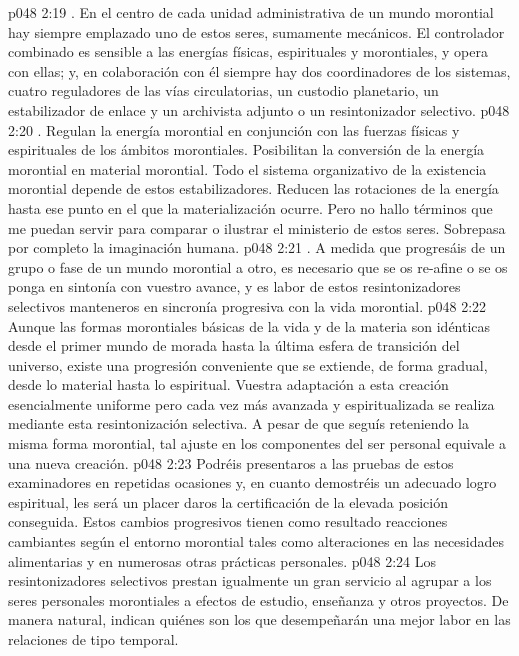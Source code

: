 \vs p048 2:19 . En el centro de cada unidad administrativa de un mundo morontial hay siempre emplazado uno de estos seres, sumamente mecánicos. El controlador combinado es sensible a las energías físicas, espirituales y morontiales, y opera con ellas; y, en colaboración con él siempre hay dos coordinadores de los sistemas, cuatro reguladores de las vías circulatorias, un custodio planetario, un estabilizador de enlace y un archivista adjunto o un resintonizador selectivo.
\vs p048 2:20 . Regulan la energía morontial en conjunción con las fuerzas físicas y espirituales de los ámbitos morontiales. Posibilitan la conversión de la energía morontial en material morontial. Todo el sistema organizativo de la existencia morontial depende de estos estabilizadores. Reducen las rotaciones de la energía hasta ese punto en el que la materialización ocurre. Pero no hallo términos que me puedan servir para comparar o ilustrar el ministerio de estos seres. Sobrepasa por completo la imaginación humana.
\vs p048 2:21 . A medida que progresáis de un grupo o fase de un mundo morontial a otro, es necesario que se os re\hyp{}afine o se os ponga en sintonía con vuestro avance, y es labor de estos resintonizadores selectivos manteneros en sincronía progresiva con la vida morontial.
\vs p048 2:22 Aunque las formas morontiales básicas de la vida y de la materia son idénticas desde el primer mundo de morada hasta la última esfera de transición del universo, existe una progresión conveniente que se extiende, de forma gradual, desde lo material hasta lo espiritual. Vuestra adaptación a esta creación esencialmente uniforme pero cada vez más avanzada y espiritualizada se realiza mediante esta resintonización selectiva. A pesar de que seguís reteniendo la misma forma morontial, tal ajuste en los componentes del ser personal equivale a una nueva creación.
\vs p048 2:23 Podréis presentaros a las pruebas de estos examinadores en repetidas ocasiones y, en cuanto demostréis un adecuado logro espiritual, les será un placer daros la certificación de la elevada posición conseguida. Estos cambios progresivos tienen como resultado reacciones cambiantes según el entorno morontial tales como alteraciones en las necesidades alimentarias y en numerosas otras prácticas personales.
\vs p048 2:24 Los resintonizadores selectivos prestan igualmente un gran servicio al agrupar a los seres personales morontiales a efectos de estudio, enseñanza y otros proyectos. De manera natural, indican quiénes son los que desempeñarán una mejor labor en las relaciones de tipo temporal.
